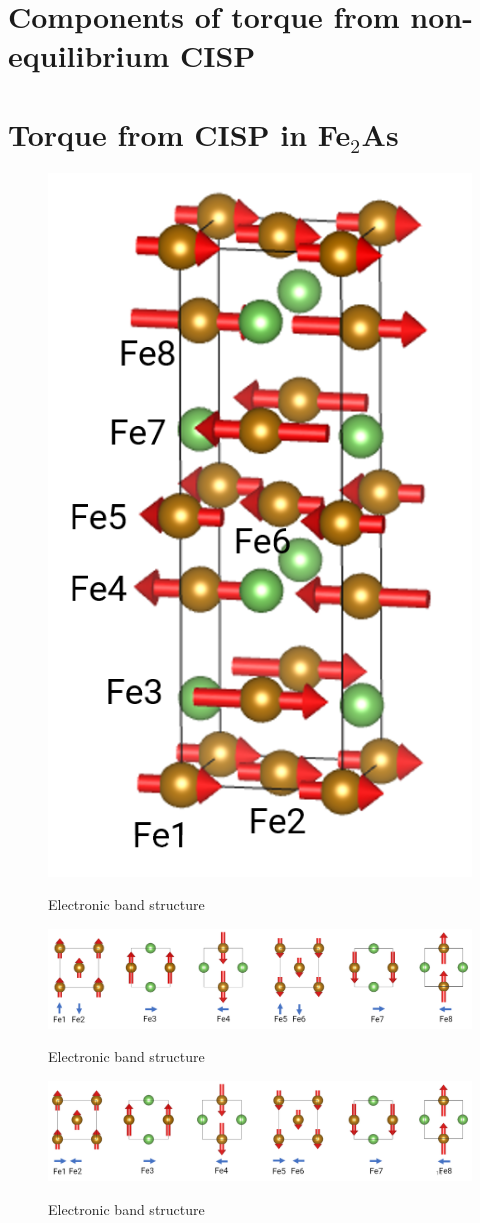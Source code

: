 \documentclass[11pt,edeposit,draftthesis]{uiucthesis2020}
\begin{document}
\begin{mainmatter}
\section{Components of torque from non-equilibrium CISP}



\section{Torque from CISP in Fe$_2$As}

\begin{figure}
\centering\includegraphics[width=0.3\columnwidth]{figures/ch2/Fe2As.png} \\
\caption{\label{fig:Fe2As}
Electronic band structure
}
\end{figure}

\begin{figure}
\centering\includegraphics[width=\columnwidth]{figures/ch2/fieldlike_torque_Fe2As.png} \\
\caption{\label{fig:fieldlike_torque_Fe2As}
Electronic band structure
}
\end{figure}

\begin{figure}
\centering\includegraphics[width=\columnwidth]{figures/ch2/antidamping_torque_Fe2As.png} \\
\caption{\label{fig:antidamping_torque_Fe2As}
Electronic band structure
}
\end{figure}


\end{mainmatter}
\end{document}
